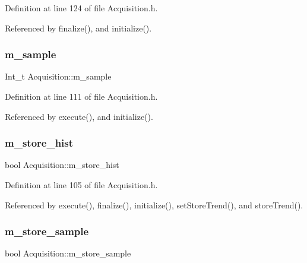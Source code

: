 Definition at line 124 of file Acquisition.\+h.



Referenced by finalize(), and initialize().

\mbox{\label{classAcquisition_a154e5423720ab1f2c4ab5cd125cb4e80}} 
\subsubsection{\texorpdfstring{m\+\_\+sample}{m\_sample}}
{\footnotesize\ttfamily Int\+\_\+t Acquisition\+::m\+\_\+sample\hspace{0.3cm}{\ttfamily [private]}}



Definition at line 111 of file Acquisition.\+h.



Referenced by execute(), and initialize().

\mbox{\label{classAcquisition_a08f70edd83751dbdab4c8190dc4b9188}} 
\subsubsection{\texorpdfstring{m\+\_\+store\+\_\+hist}{m\_store\_hist}}
{\footnotesize\ttfamily bool Acquisition\+::m\+\_\+store\+\_\+hist\hspace{0.3cm}{\ttfamily [private]}}



Definition at line 105 of file Acquisition.\+h.



Referenced by execute(), finalize(), initialize(), set\+Store\+Trend(), and store\+Trend().

\mbox{\label{classAcquisition_a987cc1d04007cf1f5acc1accfd0909e5}} 
\subsubsection{\texorpdfstring{m\+\_\+store\+\_\+sample}{m\_store\_sample}}
{\footnotesize\ttfamily bool Acquisition\+::m\+\_\+store\+\_\+sample\hspace{0.3cm}{\ttfamily [private]}}



